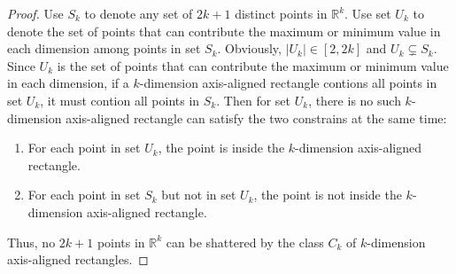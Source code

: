 \begin{proof}
    Use $S_k$ to denote any set of $2k+1$ distinct points in $\mathbb{R}^k$.
    Use set $U_k$ to denote the set of points that can contribute the maximum or minimum value in each dimension among points in set $S_k$.
    Obviously, $|U_k|\in[2,2k]$ and $U_k\subsetneq S_k$.
    Since $U_k$ is the set of points that can contribute the maximum or minimum value in each dimension,
    if a $k$-dimension axis-aligned rectangle contions all points in set $U_k$, it must contion all points in $S_k$.
    Then for set $U_k$, there is no such $k$-dimension axis-aligned rectangle can satisfy the two constrains at the same time:
    \begin{enumerate}
        \item For each point in set $U_k$, the point is inside the $k$-dimension axis-aligned rectangle.
        \item  For each point in set $S_k$ but not in set $U_k$, the point is not inside the $k$-dimension axis-aligned rectangle.
    \end{enumerate}

    Thus, no $2k+1$ points in $\mathbb{R}^k$ can be shattered by the class $C_k$ of $k$-dimension axis-aligned rectangles.
\end{proof}
\noindent {}